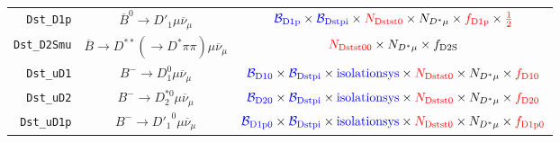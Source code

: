\begin{landscape}
\begin{table}
\begin{tabular}{r|c|c}
     \texttt{Dst\_D1p} &             $\overline{B}^0 \rightarrow D'_1 \mu \overline{\nu}_\mu$              &                                                                          $\textcolor{blue}{\mathcal{B}_\text{D1p}} \times \textcolor{blue}{\mathcal{B}_\text{Dstpi}} \times \textcolor{red}{N_\text{Dstst0}} \times N_{D^* \mu} \times \textcolor{red}{f_\text{D1p}} \times \textcolor{red}{\frac{1}{2}}$                                                                          \\
   \texttt{Dst\_D2Smu} & $\overline{B} \rightarrow D^{**} (\rightarrow D^* \pi\pi) \mu \overline{\nu}_\mu$ &                                                                                                                                                     $\textcolor{red}{N_\text{Dstst00}} \times N_{D^* \mu} \times f_\text{D2S}$                                                                                                                                                     \\
     \texttt{Dst\_uD1} &                  $B^- \rightarrow D_1^0 \mu \overline{\nu}_\mu$                   &                                                                     $\textcolor{blue}{\mathcal{B}_\text{D10}} \times \textcolor{blue}{\mathcal{B}_\text{Dstpi}} \times \textcolor{blue}{\text{isolationsys}} \times \textcolor{red}{N_\text{Dstst0}} \times N_{D^* \mu} \times \textcolor{red}{f_\text{D10}}$                                                                      \\
     \texttt{Dst\_uD2} &                 $B^- \rightarrow D_2^{*0} \mu \overline{\nu}_\mu$                 &                                                                     $\textcolor{blue}{\mathcal{B}_\text{D20}} \times \textcolor{blue}{\mathcal{B}_\text{Dstpi}} \times \textcolor{blue}{\text{isolationsys}} \times \textcolor{red}{N_\text{Dstst0}} \times N_{D^* \mu} \times \textcolor{red}{f_\text{D20}}$                                                                      \\
    \texttt{Dst\_uD1p} &                 $B^- \rightarrow {D'_1}^0 \mu \overline{\nu}_\mu$                 &                                                                    $\textcolor{blue}{\mathcal{B}_\text{D1p0}} \times \textcolor{blue}{\mathcal{B}_\text{Dstpi}} \times \textcolor{blue}{\text{isolationsys}} \times \textcolor{red}{N_\text{Dstst0}} \times N_{D^* \mu} \times \textcolor{red}{f_\text{D1p0}}$                                                                     \\

\end{tabular}
\end{table}
\end{landscape}
